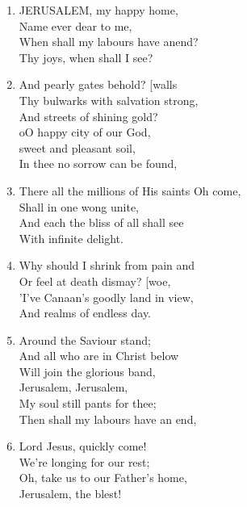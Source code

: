 \documentclass[11pt,a4paper]{article}
\begin{document}
\begin{enumerate}
    \item JERUSALEM, my happy home, \\
        Name ever dear to me, \\
        When shall my labours have anend? \\
        Thy joys, when shall I see?

    \item And pearly gates behold? [walls \\
        Thy bulwarks with salvation strong, \\
        And streets of shining gold? \\
        oO happy city of our God, \\
        sweet and pleasant soil, \\
        In thee no sorrow can be found,

    \item There all the millions of His saints Oh come, \\
        Shall in one wong unite, \\
        And each the bliss of all shall see \\
        With infinite delight.

    \item Why should I shrink from pain and \\
        Or feel at death dismay? [woe, \\
        'I've Canaan's goodly land in view, \\
        And realms of endless day.

    \item Around the Saviour stand; \\
        And all who are in Christ below \\
        Will join the glorious band, \\
        Jerusalem, Jerusalem, \\
        My soul still pants for thee; \\
        Then shall my labours have an end,

    \item Lord Jesus, quickly come! \\
        We're longing for our rest; \\
        Oh, take us to our Father's home, \\
        Jerusalem, the blest!

\end{enumerate}
\end{document}
